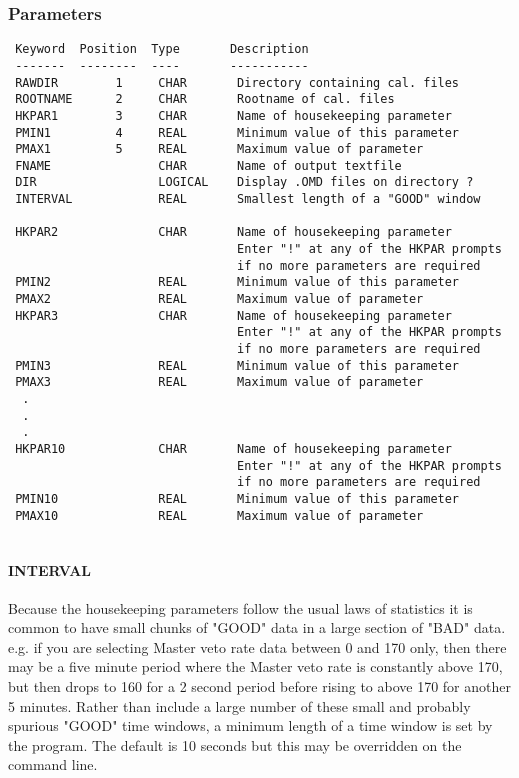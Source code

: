 \documentclass{book}
\renewcommand{\_}{{\tt\char'137}}     %
\begin{document}
\subsubsection{Parameters}
\begin{verbatim}
 Keyword  Position  Type       Description
 -------  --------  ----       -----------
 RAWDIR        1     CHAR       Directory containing cal. files
 ROOTNAME      2     CHAR       Rootname of cal. files
 HKPAR1        3     CHAR       Name of housekeeping parameter
 PMIN1         4     REAL       Minimum value of this parameter
 PMAX1         5     REAL       Maximum value of parameter
 FNAME               CHAR       Name of output textfile
 DIR                 LOGICAL    Display .OMD files on directory ?
 INTERVAL            REAL       Smallest length of a "GOOD" window
                                     
 HKPAR2              CHAR       Name of housekeeping parameter
                                Enter "!" at any of the HKPAR prompts
                                if no more parameters are required
 PMIN2               REAL       Minimum value of this parameter
 PMAX2               REAL       Maximum value of parameter
 HKPAR3              CHAR       Name of housekeeping parameter
                                Enter "!" at any of the HKPAR prompts
                                if no more parameters are required
 PMIN3               REAL       Minimum value of this parameter
 PMAX3               REAL       Maximum value of parameter
  .
  .
  .
 HKPAR10             CHAR       Name of housekeeping parameter
                                Enter "!" at any of the HKPAR prompts
                                if no more parameters are required
 PMIN10              REAL       Minimum value of this parameter
 PMAX10              REAL       Maximum value of parameter
 
\end{verbatim}\paragraph{INTERVAL}
Because the housekeeping parameters follow the usual laws of
statistics it is common to have small chunks of "GOOD" data in a
large section of "BAD" data. e.g. if you are selecting Master veto
rate data between 0 and 170 only, then there may be a five minute
period where the Master veto rate is constantly above 170, but then
drops to 160 for a 2 second period before rising to above 170 for
another 5 minutes. Rather than include a large number of these
small and probably spurious "GOOD" time windows, a minimum length
of a time window is set by the program. The default is 10 seconds
but this may be overridden on the command line.
 
\end{document}
